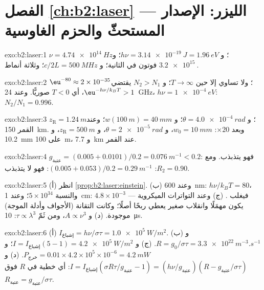 \section*{الفصل \ref{ch:b2:laser} --- الليزر: الإصدار المستحثّ والحزم الغاوسية}

\begin{solution}{exo:b2:laser:1}
$\nu = \qty{4.74e14}{Hz}$؛ و $h\nu = \qty{3.14e-19}{J} = \qty{1.96}{eV}$؛
و $\qty{3.2e15}{}$ فوتون في الثانية؛ و $c/2L = \qty{500}{MHz}$؛ وثلاثة
أنماط.
\end{solution}

\begin{solution}{exo:b2:laser:2}
$\eu^{-80} \approx 2 \times 10^{-35}$؛ ولا تساوي إلا حين $T \to \infty$؛
و $N_2 > N_1$ يقتضي $\eu^{-h\nu/k_BT} > 1$، أي $T < 0$ صوريًّا. وعند
\qty{24}{GHz}، $h\nu = \qty{1e-4}{eV}$: $N_2/N_1 = 0.996$.
\end{solution}

\begin{solution}{exo:b2:laser:3}
$z_{\text{R}} = \qty{1.24}{m}$؛ و $\theta = \qty{4.0e-4}{rad}$؛ و $w(\qty{100}{m}) =
\qty{40}{mm}$؛ وعند القمر \qty{150}{km}. وبعد $\times 20$: $w_0 = \qty{10}{mm}$،
و $\theta = \qty{2e-5}{rad}$، و $z_{\text{R}} = \qty{500}{m}$، و \qty{10.2}{mm} على
\qty{100}{m}، و \qty{7.7}{km} عند القمر.
\end{solution}

\begin{solution}{exo:b2:laser:4}
$g_{\text{عتبة}} = (0.005 + 0.0101)/0.2 = \qty{0.076}{m^{-1}} < 0.2$: فهو
يتذبذب. ومع $R_2 = 0.90$: $(0.005 + 0.053)/0.2 = \qty{0.29}{m^{-1}}$: فهو
لا يتذبذب.
\end{solution}

\begin{solution}{exo:b2:laser:5}
(أ) انظر \cref{prop:b2:laser:einstein}. (ب) وعند \qty{600}{nm}: $h\nu/k_BT
= 80$، والنسبة $5 \times 10^{34}$؛ وعند \qty{1}{cm}: $4.8 \times 10^{-3}$ ---
فيغلب . (ج) وعند التواترات الميكروية يكون
 مهمَلًا وانقلاب صغير يعطي ربحًا
أصلًا؛ وكانت التقانة (الأجواف وأدلة الموجة) موجودة. (د) و $A \propto
\nu^3$، ومن ثَمّ $\tau \propto \lambda^3$: \qty{10}{\micro s}.
\end{solution}

\begin{solution}{exo:b2:laser:6}
(أ) $I_{\text{إشباع}} = h\nu/\sigma\tau = \qty{1.0e5}{W/m^2}$. (ب) و $R =
g_0/\sigma\tau = \qty{3.3e22}{m^{-3}.s^{-1}}$. (ج) و $I = I_{\text{إشباع}}(5 - 1) =
\qty{4.2e5}{W/m^2}$؛ و $P_{\text{خرج}} = 0.01 \times 4.2 \times 10^5 \times
10^{-6} = \qty{4.2}{mW}$. (د) و $I = I_{\text{إشباع}}(\sigma R\tau/g_{\text{عتبة}}
- 1) = (h\nu/g_{\text{عتبة}})(R - g_{\text{عتبة}}/\sigma\tau)$: أي خطية في $R$
فوق $R_{\text{عتبة}} = g_{\text{عتبة}}/\sigma\tau$.
\end{solution}


